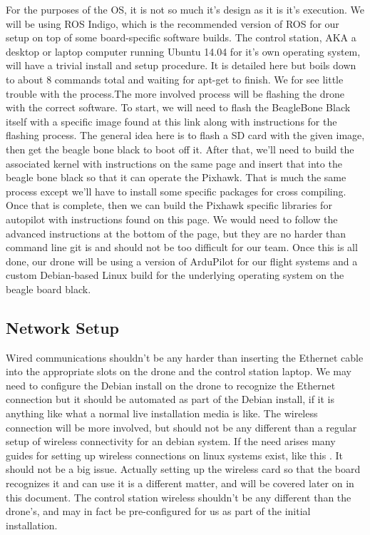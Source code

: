 \documentclass[IEEEtran,letterpaper,10pt,titlepage,draftclsnofoot,onecolumn]{article}
\begin{document}
For the purposes of the OS, it is not so much it's design as it is it's execution.
We will be using ROS Indigo, which is the recommended version of ROS for our setup on top of some board-specific software
builds. The control station, AKA a desktop or laptop computer running Ubuntu 14.04 for it's own operating system, will have a
trivial install and setup procedure. It is detailed here\cite{Indigo} but boils down to about 8 commands total and waiting for
apt-get to finish. We for see little trouble with the process.The more involved process will be flashing the drone with the
correct software. To start, we will need to flash the BeagleBone Black itself with a specific image found at this link along
with instructions for the flashing process\cite{buildingBBB}. The general idea here is to flash a SD card with the given image,
then get the beagle bone black to boot off it. After that, we'll need to build the associated kernel with instructions on the
same page and insert that into the beagle bone black so that it can operate the Pixhawk. That is much the same process except
we'll have to install some specific packages for cross compiling. Once that is complete, then we can build the Pixhawk specific
libraries for autopilot with instructions found on this page\cite{buildingPX}. We would need to follow the advanced
instructions at the bottom of the page, but they are no harder than command line git is and should not be too difficult for our
team. Once this is all done, our drone will be using a version of ArduPilot for our flight systems and a custom Debian-based
Linux build for the underlying operating system on the beagle board black.

\subsection*{Network Setup}

Wired communications shouldn't be any harder than inserting the Ethernet cable into the appropriate slots on the drone and the
control station laptop. We may need to configure the Debian install on the drone to recognize the Ethernet connection but it
should be automated as part of the Debian install, if it is anything like what a normal live installation media is like.
The wireless connection will be more involved, but should not be any different than a regular setup of wireless connectivity
for an debian system. If the need arises many guides for setting up wireless connections on linux systems exist, like this
\cite{wirelessconfig}. It should not be a big issue. Actually setting up the wireless card so that the board recognizes it and
can use it is a different matter, and will be covered later on in this document. The control station wireless shouldn't be
any different than the drone's, and may in fact be pre-configured for us as part of the initial installation.
\end{document}
